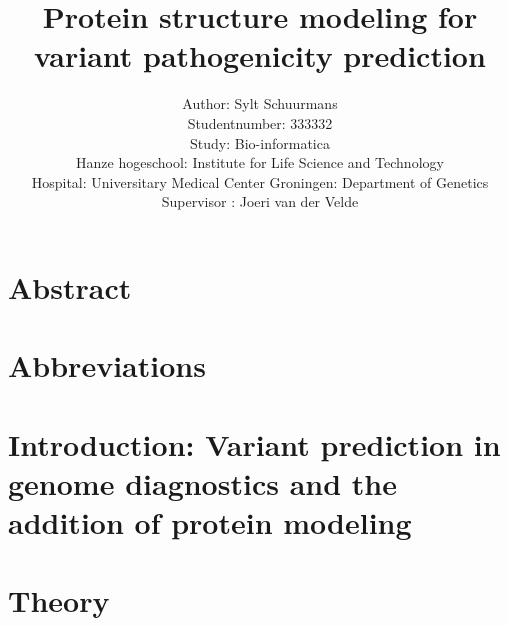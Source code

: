 \documentclass[10pt]{article}
\begin{document}
	\title{Protein structure modeling for variant pathogenicity prediction}
	\author{Author: Sylt Schuurmans\\
		Studentnumber: 333332\\
		Study: Bio-informatica\\
		Hanze hogeschool: Institute for Life Science and Technology\\
		Hospital: Universitary Medical Center Groningen: Department of Genetics\\
		Supervisor : Joeri van der Velde}
	\maketitle
	\newpage
	
	
	\section*{Abstract}
	
	\label{section:Chap_Introduction}
	\newpage
	
	\section*{Abbreviations}
	
	\label{section:Chap_Abbreviations}
	\newpage
	
	\tableofcontents
	\newpage
	
	\listoffigures
	\newpage
	
	\listoftables
	\newpage
	
	\section[Introduction]{Introduction: Variant prediction in genome diagnostics and the addition of protein modeling}
	
	\label{section:Chap_Variant_Prediction_In_Genome_Diagnostics}
	\newpage
	
	\section{Theory}
	
	\label{section:Chap_PMT}
	\newpage
	
\end{document}

